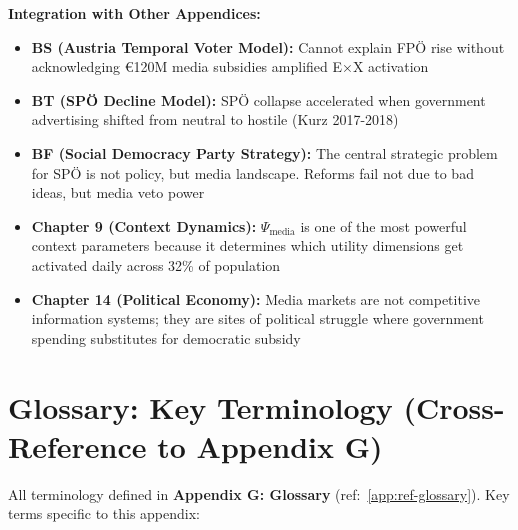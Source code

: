 \textbf{Integration with Other Appendices:}

\begin{itemize}
\item \textbf{BS (Austria Temporal Voter Model):} Cannot explain FPÖ rise without
  acknowledging €120M media subsidies amplified E×X activation

\item \textbf{BT (SPÖ Decline Model):} SPÖ collapse accelerated when government
  advertising shifted from neutral to hostile (Kurz 2017-2018)

\item \textbf{BF (Social Democracy Party Strategy):} The central strategic problem
  for SPÖ is not policy, but media landscape. Reforms fail not due to bad ideas,
  but media veto power

\item \textbf{Chapter 9 (Context Dynamics):} $\Psi_{\text{media}}$ is one of the
  most powerful context parameters because it determines which utility dimensions
  get activated daily across 32\% of population

\item \textbf{Chapter 14 (Political Economy):} Media markets are not competitive
  information systems; they are sites of political struggle where government
  spending substitutes for democratic subsidy
\end{itemize}


\section{Glossary: Key Terminology (Cross-Reference to Appendix G)}
\label{sec:dx-glossary}

All terminology defined in \textbf{Appendix G: Glossary} (ref:~\ref{app:ref-glossary}).
Key terms specific to this appendix:

